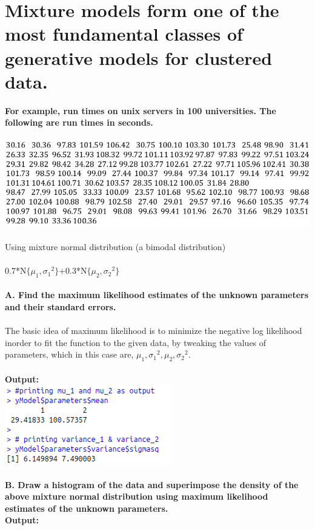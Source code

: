 \documentclass[12pt,a4paper]{report}
\begin{document}
\section{Mixture models form one of the most fundamental classes of generative models for
clustered data.}
\textbf{For example, run times on unix servers in 100 universities. The following are run times
in seconds.}\\\\
\includegraphics[scale=0.45]{a.png}
\\
\\
Using mixture normal distribution (a bimodal distribution)\\\\
0.7*N$\lbrace \mu_1,{\sigma_1}^2\rbrace$+0.3*N$\lbrace \mu_2,{\sigma_2}^2 \rbrace$\\\\
\textbf{A. Find the maximum likelihood estimates of the unknown parameters and their standard errors.}
\\\\
The basic idea of maximum likelihood is to minimize the negative log likelihood inorder to fit the function to the given data, by tweaking the values of parameters, which in this case are, \textit{$\mu_1,{\sigma_1}^2,\mu_2,{\sigma_2}^2$}.
\\\\
\textbf{Output:}\\
\includegraphics[scale=0.75]{q2_a.png}
\\\\
\textbf{B. Draw a histogram of the data and superimpose the density of the above mixture normal distribution using maximum likelihood estimates of the unknown parameters.}\\
\textbf{Output:}
\\
\end{document}
